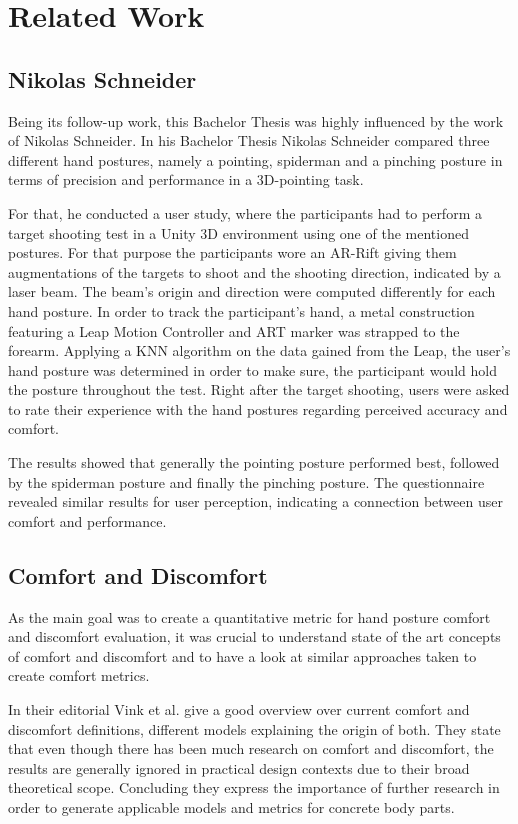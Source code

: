 \chapter{Related Work}\label{chapter:related}

\section{Nikolas Schneider}

Being its follow-up work, this Bachelor Thesis was highly influenced by the work of Nikolas Schneider. In his Bachelor Thesis Nikolas Schneider compared three different hand postures, namely a pointing, spiderman and a pinching posture in terms of precision and performance in a 3D-pointing task. 

For that, he conducted a user study, where the participants had to perform a target shooting test in a Unity 3D environment using one of the mentioned postures. For that purpose the participants wore an AR-Rift giving them augmentations of the targets to shoot and the shooting direction, indicated by a laser beam. The beam's origin and direction were computed differently for each hand posture.  In order to track the participant's hand, a metal construction featuring a Leap Motion Controller and ART marker was strapped to the forearm. Applying a KNN algorithm on the data gained from the Leap, the user's hand posture was determined in order to make sure, the participant would hold the posture throughout the test. Right after the target shooting, users were asked to rate their experience with the hand postures regarding perceived accuracy and comfort. 

The results showed that generally the pointing posture performed best, followed by the spiderman posture and finally the pinching posture. The questionnaire revealed similar results for user perception, indicating a connection between user comfort and performance.

\section{Comfort and Discomfort}

As the main goal was to create a quantitative metric for hand posture comfort and discomfort evaluation, it was crucial to understand state of the art concepts of comfort and discomfort and to have a look at similar approaches taken to create comfort metrics.

In their editorial Vink et al. \cite{vink2012editorial} give a good overview over current comfort and discomfort definitions, different models explaining the origin of both. They state that even though there has been much research on comfort and discomfort, the results are generally ignored in practical design contexts due to their broad theoretical scope. Concluding they express the importance of further research in order to generate applicable models and metrics for concrete body parts.


